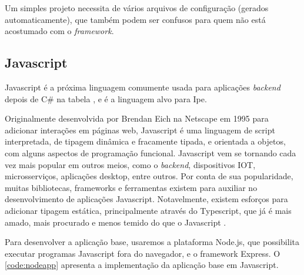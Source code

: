 Um simples projeto necessita de vários arquivos de configuração (gerados automaticamente),
que também podem ser confusos para quem não está acostumado com o \textit{framework}.


\subsection{Javascript}\label{subsec:js}

Javascript é a próxima linguagem comumente usada para aplicações \textit{backend}
depois de C\# na tabela \textcite{tiobeindex}, e é a linguagem alvo para Ipe.

Originalmente desenvolvida por Brendan Eich na Netscape em 1995 para adicionar
interações em páginas web, Javascript é uma linguagem de script interpretada, de
tipagem dinâmica e fracamente tipada, e orientada a objetos, com alguns aspectos
de programação funcional. Javascript vem se tornando cada vez mais popular em
outros meios, como o \textit{backend}, dispositivos IOT, microsserviços, aplicações
desktop, entre outros. Por conta de sua popularidade, muitas bibliotecas, frameworks
e ferramentas existem para auxiliar no desenvolvimento de aplicações Javascript.
Notavelmente, existem esforços para adicionar tipagem estática, principalmente
através do Typescript, que já é mais amado, mais procurado e menos temido do que
o Javascript \textcite{stackoverflowsurvey}.

Para desenvolver a aplicação base, usaremos a plataforma Node.js, que possibilita
executar programas Javascript fora do navegador, e o framework Express. O
\autoref{code:nodeapp} apresenta a implementação da aplicação base em Javascript.



